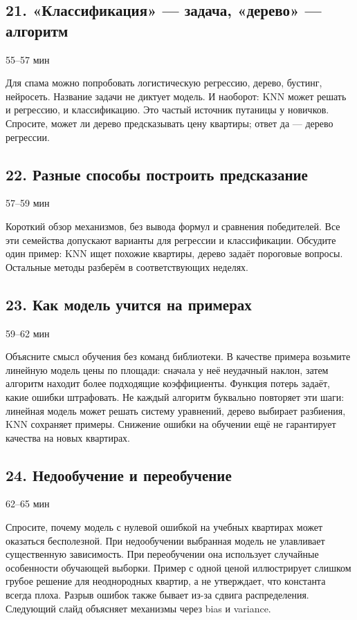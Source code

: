 \documentclass[11pt,a4paper]{article}
\newcommand{\timing}[1]{\hfill{\small\color{blue}#1}}
\begin{document}
\subsection{21. «Классификация» — задача, «дерево» — алгоритм}
\timing{55–57 мин}

Для спама можно попробовать логистическую регрессию, дерево, бустинг, нейросеть. Название задачи не диктует модель. И наоборот: KNN может решать и регрессию, и классификацию. Это частый источник путаницы у новичков. Спросите, может ли дерево предсказывать цену квартиры; ответ да — дерево регрессии.

\subsection{22. Разные способы построить предсказание}
\timing{57–59 мин}

Короткий обзор механизмов, без вывода формул и сравнения победителей. Все эти семейства допускают варианты для регрессии и классификации. Обсудите один пример: KNN ищет похожие квартиры, дерево задаёт пороговые вопросы. Остальные методы разберём в соответствующих неделях.

\subsection{23. Как модель учится на примерах}
\timing{59–62 мин}

Объясните смысл обучения без команд библиотеки. В качестве примера возьмите линейную модель цены по площади: сначала у неё неудачный наклон, затем алгоритм находит более подходящие коэффициенты. Функция потерь задаёт, какие ошибки штрафовать. Не каждый алгоритм буквально повторяет эти шаги: линейная модель может решать систему уравнений, дерево выбирает разбиения, KNN сохраняет примеры. Снижение ошибки на обучении ещё не гарантирует качества на новых квартирах.

\subsection{24. Недообучение и переобучение}
\timing{62–65 мин}

Спросите, почему модель с нулевой ошибкой на учебных квартирах может оказаться бесполезной. При недообучении выбранная модель не улавливает существенную зависимость. При переобучении она использует случайные особенности обучающей выборки. Пример с одной ценой иллюстрирует слишком грубое решение для неоднородных квартир, а не утверждает, что константа всегда плоха. Разрыв ошибок также бывает из-за сдвига распределения. Следующий слайд объясняет механизмы через bias и variance.
\end{document}

